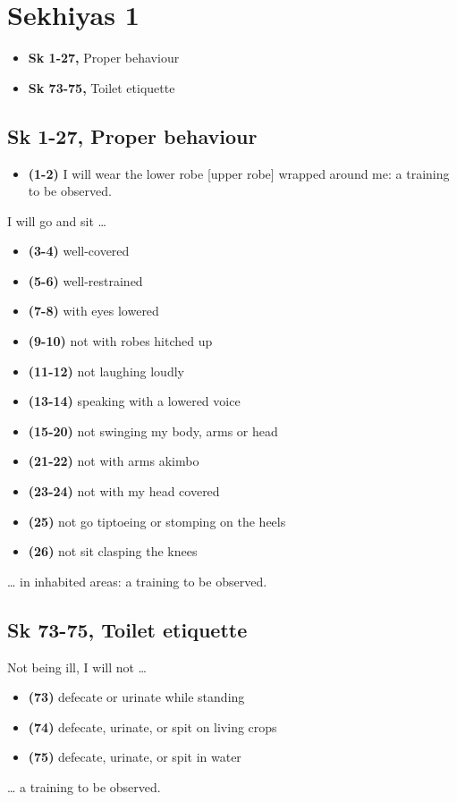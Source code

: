 \chapter{Sekhiyas 1}

\begin{itemize}
\tightlist
\item
  \textbf{Sk 1-27,} Proper behaviour
\item
  \textbf{Sk 73-75,} Toilet etiquette
\end{itemize}

\section{Sk 1-27, Proper behaviour}

\begin{itemize}
\tightlist
\item
  \textbf{(1-2)} I will wear the lower robe {[}upper robe{]} wrapped
  around me: a training to be observed.
\end{itemize}

I will go and sit \ldots{}

\begin{itemize}
\tightlist
\item
  \textbf{(3-4)} well-covered
\item
  \textbf{(5-6)} well-restrained
\item
  \textbf{(7-8)} with eyes lowered
\item
  \textbf{(9-10)} not with robes hitched up
\item
  \textbf{(11-12)} not laughing loudly
\item
  \textbf{(13-14)} speaking with a lowered voice
\item
  \textbf{(15-20)} not swinging my body, arms or head
\item
  \textbf{(21-22)} not with arms akimbo
\item
  \textbf{(23-24)} not with my head covered
\item
  \textbf{(25)} not go tiptoeing or stomping on the heels
\item
  \textbf{(26)} not sit clasping the knees
\end{itemize}

\ldots{} in inhabited areas: a training to be observed.

\section{Sk 73-75, Toilet etiquette}

Not being ill, I will not \ldots{}

\begin{itemize}
\tightlist
\item
  \textbf{(73)} defecate or urinate while standing
\item
  \textbf{(74)} defecate, urinate, or spit on living crops
\item
  \textbf{(75)} defecate, urinate, or spit in water
\end{itemize}

\ldots{} a training to be observed.


